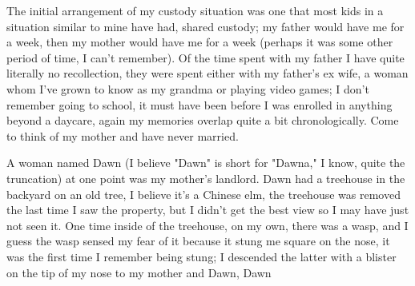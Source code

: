 \documentclass[12pt]{article}
\begin{document}
The initial arrangement of my custody situation was one that most kids in a situation similar to mine
    have had, shared custody; my father would have me for a week, then my mother would have me for a week
    (perhaps it was some other period of time, I can't remember).
Of the time spent with my father I have quite literally no recollection, they were
    spent either with my father's ex wife, a woman whom I've grown to know as my grandma or playing video
    games; I don't remember going to school, it must have been before I was enrolled in anything beyond a
    daycare, again my memories overlap quite a bit chronologically.
Come to think of my  mother and have never married.

A woman named Dawn (I believe "Dawn" is short for "Dawna," I know, quite the truncation) at one point was
    my mother's landlord. Dawn had a treehouse in the backyard on an old tree, I believe it's a Chinese elm,
    the treehouse was removed the last time I saw the property, but I didn't get the best view so I may have
    just not seen it. One time inside of the treehouse, on my own, there was a wasp, and I guess the wasp
    sensed my fear of it because it stung me square on the nose, it was the first time I remember being
    stung; I descended the latter with a blister on the tip of my nose to my mother and Dawn, Dawn 
\end{document}

